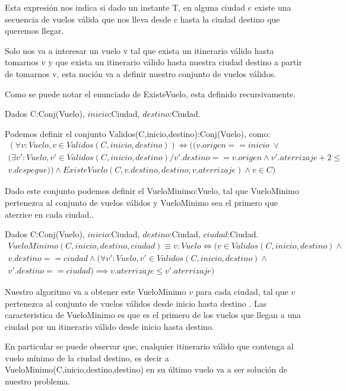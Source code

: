 Esta expresi\'on nos indica si dado un instante T, en alguna ciudad c existe una secuencia de vuelos v\'alida que nos lleva desde c hasta la ciudad destino que queremos llegar.

Solo nos va a interesar un vuelo v tal que exista un itinerario v\'alido hasta tomarnos v y que exista un itinerario v\'alido hasta nuestra ciudad destino a partir de tomarnos v, esta noci\'on va a definir nuestro conjunto de vuelos v\'alidos.

Como se puede notar el enunciado de ExisteVuelo, esta definido recursivamente.

Dados C:Conj(Vuelo), $inicio$:Ciudad, $destino$:Ciudad.

Podemos definir el conjunto Validos(C,inicio,destino):Conj(Vuelo), como:
\begin{align*}
(\forall v:Vuelo, v \in Validos(C,inicio,destino)) \Leftrightarrow ((v.origen == inicio \;\vee \\
(\exists v':Vuelo, v' \in Validos(C,inicio,destino) / v'.destino == v.origen \wedge v'.aterrizaje + 2 \leq\\ v.despegue)) \wedge ExisteVuelo(C,v.destino,destino,v.aterrizaje) \wedge v \in C)
\end{align*}

Dado este conjunto podemos definir el VueloMinimo:Vuelo, tal que VueloMinimo pertenezca al conjunto de vuelos v\'alidos y VueloMinimo sea el primero que aterrice en cada ciudad..

Dados C:Conj(Vuelo), $inicio$:Ciudad, $destino$:Ciudad, $ciudad$:Ciudad.
\begin{align*}
VueloMinimo(C,inicio,destino,ciudad) \equiv v:Vuelo \Leftrightarrow (v \in Validos(C,inicio,destino) \wedge\\ v.destino == ciudad \wedge (\forall v':Vuelo, v' \in Validos(C,inicio,destino) \wedge \\
v'.destino == ciudad) \implies v.aterrizaje \leq v'.aterrizaje)
\end{align*}

Nuestro algoritmo va a obtener este VueloMinimo $v$ para cada ciudad, tal que $v$ pertenezca al conjunto de vuelos v\'alidos desde inicio hasta destino . Las caracteristica de VueloMinimo es que es el primero de los vuelos que llegan a una ciudad por un itinerario v\'alido desde inicio hasta destino.

En particular se puede observar que, cualquier itinerario v\'alido que contenga al vuelo m\'inimo de la ciudad destino, es decir a VueloMinimo(C,inicio,destino,destino) en su \'ultimo vuelo va a ser soluci\'on de nuestro problema. 

